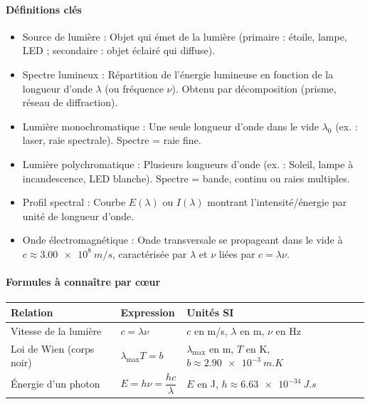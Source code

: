 \documentclass[11pt]{article}
\newcommand{\cle}[1]{{\popxbold\color{popdark}#1}}
\begin{document}
\begin{bilan}
\paragraph{Définitions clés}
\begin{itemize}
    \item \cle{Source de lumière} : Objet qui émet de la lumière (primaire : étoile, lampe, LED ; secondaire : objet éclairé qui diffuse).
    \item \cle{Spectre lumineux} : Répartition de l'énergie lumineuse en fonction de la longueur d'onde $\lambda$ (ou fréquence $\nu$). Obtenu par décomposition (prisme, réseau de diffraction).
    \item \cle{Lumière monochromatique} : Une seule longueur d'onde dans le vide $\lambda_0$ (ex. : laser, raie spectrale). Spectre = raie fine.
    \item \cle{Lumière polychromatique} : Plusieurs longueurs d'onde (ex. : Soleil, lampe à incandescence, LED blanche). Spectre = bande, continu ou raies multiples.
    \item \cle{Profil spectral} : Courbe $E(\lambda)$ ou $I(\lambda)$ montrant l'intensité/énergie par unité de longueur d'onde.
    \item \cle{Onde électromagnétique} : Onde transversale se propageant dans le vide à $c \approx \SI{3,00e8}{m/s}$, caractérisée par $\lambda$ et $\nu$ liées par $c = \lambda \nu$.
\end{itemize}

\paragraph{Formules à connaître par cœur}
\begin{center}
\begin{tabularx}{\linewidth}{|>{\centering\arraybackslash}X|>{\centering\arraybackslash}X|>{\centering\arraybackslash}X|}
\hline
\rowcolor{popblueL}
\textbf{Relation} & \textbf{Expression} & \textbf{Unités SI} \\
\hline
Vitesse de la lumière & $c = \lambda \nu$ & $c$ en \si{m/s}, $\lambda$ en \si{m}, $\nu$ en \si{Hz} \\
\hline
Loi de Wien (corps noir) & $\lambda_{\max} T = b$ & $\lambda_{\max}$ en \si{m}, $T$ en \si{K}, $b \approx \SI{2,90e-3}{m.K}$ \\
\hline
Énergie d'un photon & $E = h \nu = \dfrac{hc}{\lambda}$ & $E$ en \si{J}, $h \approx \SI{6,63e-34}{J.s}$ \\
\hline
\end{tabularx}
\end{center}


\end{bilan}
\end{document}
